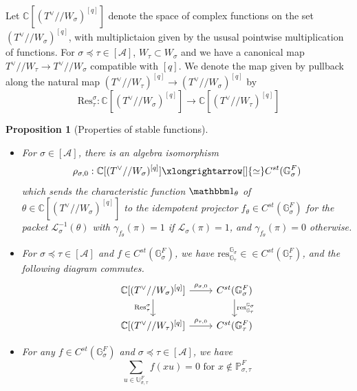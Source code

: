 \documentclass[11 pt]{article}
\numberwithin{equation}{subsection}
\newtheorem{proposition}[theorem]{Proposition}
\theoremstyle{definition}
\theoremstyle{remark}
\theoremstyle{conjecture}
\newcommand{\sA}{\mathscr A}
\newcommand{\Res}{\mathrm{Res}}
\newcommand{\res}{\mathrm{res}}
\newcommand{\mbP}{\mathbb P}
\newcommand{\U}{\mathbb U}
\newcommand{\C}{\mathbb C}
\newcommand{\G}{\mathbb G}
\newcommand{\mc}{\mathcal}
\begin{document}
Let $\C[(T^\vee //W_\sigma)^{[q]}]$ denote the space of complex functions on the set $(T^\vee //W_\sigma)^{[q]}$, with multiplictaion given by the ususal pointwise multiplication of functions. For $\sigma\preceq \tau \in [\sA]$, $W_\tau \subset W_\sigma$ and we have a canonical map $T^\vee//W_\tau \rightarrow T^\vee //W_\sigma$ compatible with $[q]$. We denote the map given by pullback along the natural map  $(T^\vee //W_\tau)^{[q]} \rightarrow (T^\vee //W_\sigma)^{[q]}$ by 
\begin{equation*}
    \Res^\sigma_\tau : \C[(T^\vee //W_\sigma)^{[q]}] \rightarrow \C[(T^\vee //W_\tau)^{[q]}]
\end{equation*}
\begin{proposition}[Properties of stable functions]
    \begin{itemize}
        \item [(1)] For $\sigma \in [\sA]$, there is an algebra isomorphism 
        \begin{equation*}
            \rho_{\sigma,0}: \C[(T^\vee //W_\sigma)^{[q]}]\xlongrightarrow[]{\simeq} C^{st}(\G^F_\sigma)
        \end{equation*}
        which sends the characteristic function $\mathbbm 1_\theta $ of $\theta \in \C[(T^\vee //W_\sigma)^{[q]}] $ to the idempotent projector $f_\theta \in C^{st}(\G^F_\sigma)$ for the packet $\mc L_\sigma^{-1}(\theta)$ with $\gamma_{f_\theta}(\pi)=1$ if $\mc L_\sigma(\pi)=1$, and $\gamma_{f_\theta}(\pi)=0$ otherwise. 
        \item[(2)] For $\sigma \preceq \tau \in [\sA]$ and $f  \in C^{st}(\G^F_\sigma)$, we have $\res^{\G_\sigma}_{\G_\tau} \in  \in C^{st}(\G^F_\tau)$, and the following diagram commutes. 
        \begin{equation}\label{restrictionstabledepth0}
            \begin{tikzcd}
             \C[(T^\vee //W_\sigma)^{[q]}] \arrow{r}{\rho_{\sigma,0}} \arrow{d}[swap]{\Res^{\sigma}_{\tau}} & C^{st}(\G^F_\sigma) \arrow{d}{\res^{\G_\sigma}_{\G_\tau}} \\
             \C[(T^\vee //W_\tau)^{[q]}]  \arrow{r}{\rho_{\tau,0}} & C^{st}(\G^F_\tau)  
            \end{tikzcd}
        \end{equation}
        \item[(3)] For any $f \in C^{st}(\G^F_\sigma)$ and $\sigma \preceq \tau \in [\sA]$, we have 
        \begin{equation*}
            \sum_{u \in \U_{\sigma,\tau}^F}f(xu)= 0 \text{   for   } x \not \in \mbP_{\sigma,\tau}^F
        \end{equation*}
    \end{itemize}
\end{proposition}
\end{document}
